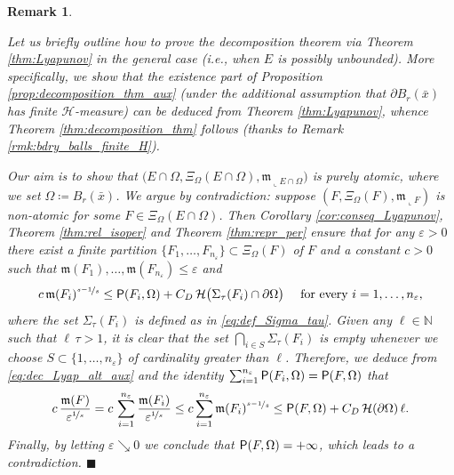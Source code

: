\documentclass[reqno]{amsart}
\numberwithin{equation}{section}
\newcommand{\N}{\mathbb{N}}
\newcommand{\mm}{\mathfrak m}
\newcommand{\1}{\mathbbm 1}
\newcommand{\eps}{\varepsilon}
\renewcommand{\P}{{\sf P}}
\renewcommand{\H}{{\mathcal H}}
\newcommand{\fr}{\penalty-20\null\hfill\(\blacksquare\)}
\newtheorem{remark}[theorem]{Remark}
\begin{document}
%
%
\begin{remark}\label{rmk:Lyapunov_E_unbdd}{\rm
Let us briefly outline how to prove the decomposition theorem via
Theorem \ref{thm:Lyapunov} in the general case (i.e., when
\(E\) is possibly unbounded). More specifically, we show that the existence
part of Proposition \ref{prop:decomposition_thm_aux} (under the additional
assumption that \(\partial B_r(\bar x)\) has finite \(\H\)-measure) can be
deduced from Theorem \ref{thm:Lyapunov}, whence Theorem
\ref{thm:decomposition_thm} follows (thanks to Remark \ref{rmk:bdry_balls_finite_H}).

Our aim is to show that
\(\big(E\cap\Omega,\Xi_\Omega(E\cap\Omega),\mm_{\llcorner E\cap\Omega}\big)\)
is purely atomic, where we set \(\Omega\coloneqq B_r(\bar x)\).
We argue by contradiction: suppose \((F,\Xi_\Omega(F),\mm_{\llcorner F})\)
is non-atomic for some \(F\in\Xi_\Omega(E\cap\Omega)\).
Then Corollary \ref{cor:conseq_Lyapunov}, Theorem \ref{thm:rel_isoper}
and Theorem \ref{thm:repr_per} ensure that for any \(\eps>0\) there exist
a finite partition \(\{F_1,\ldots,F_{n_\eps}\}\subset\Xi_\Omega(F)\) of \(F\) and
a constant \(c>0\) such that \(\mm(F_1),\ldots,\mm(F_{n_\eps})\leq\eps\) and
\begin{equation}\label{eq:dec_Lyap_alt_aux}
c\,\mm(F_i)^{\nicefrac{s-1}{s}}
\leq\P(F_i,\Omega)+C_D\,\H\big(\Sigma_\tau(F_i)\cap\partial\Omega\big)
\quad\text{ for every }i=1,\ldots,n_\eps,
\end{equation}
where the set \(\Sigma_\tau(F_i)\) is defined as in \eqref{eq:def_Sigma_tau}.
Given any \(\ell\in\N\) such that \(\ell\,\tau>1\), it is clear that the set
\(\bigcap_{i\in S}\Sigma_\tau(F_i)\) is empty whenever we choose
\(S\subset\{1,\ldots,n_\eps\}\) of cardinality greater than \(\ell\).
Therefore, we deduce from \eqref{eq:dec_Lyap_alt_aux} and the
identity \(\sum_{i=1}^{n_\eps}\P(F_i,\Omega)=\P(F,\Omega)\) that
\[
c\,\frac{\mm(F)}{\eps^{\nicefrac{1}{s}}}
=c\,\sum_{i=1}^{n_\eps}\frac{\mm(F_i)}{\eps^{\nicefrac{1}{s}}}
\leq c\sum_{i=1}^{n_\eps}\mm(F_i)^{\nicefrac{s-1}{s}}
\leq\P(F,\Omega)+C_D\,\H(\partial\Omega)\,\ell.
\]
Finally, by letting \(\eps\searrow 0\) we conclude that \(\P(F,\Omega)=+\infty\),
which leads to a contradiction.
\fr}\end{remark}
%
%
%
%
\appendix
%
%
\end{document}
